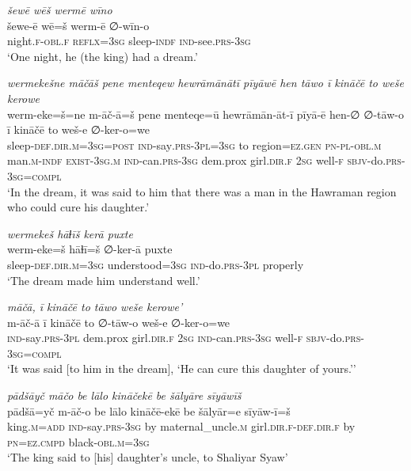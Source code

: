 \ea \label{ŽP.153}
\textit{šewē wēš wermē wīno} \\ 
\gll šewe-ē wē=š werm-ē ∅-wīn-o \\ 
 night\textsc{.f}\textsc{-obl}\textsc{.f} \textsc{reflx}\textsc{=3sg} sleep\textsc{-indf} \textsc{ind-}see\textsc{.prs}\textsc{-3sg} \\ 
\glt `One night, he (the king) had a dream.'
\z 
 
\ea \label{ŽP.154}
\textit{wermekešne māčāš pene menteqew hewrāmānātī pīyāwē hen tāwo ī kināčē to weše kerowe} \\ 
\gll werm-eke=š=ne m-āč-ā=š pene menteqe=ū hewrāmān-āt-ī pīyā-ē hen-∅ ∅-tāw-o ī kināčē to weš-e ∅-ker-o=we \\ 
 sleep\textsc{-def}\textsc{.dir}\textsc{.m}\textsc{=3sg}\textsc{=\textsc{post}} \textsc{ind-}say\textsc{.prs}\textsc{-3pl}\textsc{=3sg} to region=\textsc{ez.gen} \textsc{pn}\textsc{\textsc{-pl}}\textsc{-obl}\textsc{.m} man\textsc{.m}\textsc{-indf} \textsc{exist}\textsc{-3sg}\textsc{.m} \textsc{ind-}can\textsc{.prs}\textsc{-3sg} dem.prox girl\textsc{.dir}\textsc{.f} \textsc{2sg} well\textsc{-f} \textsc{sbjv-}do\textsc{.prs}\textsc{-3sg}\textsc{=compl} \\ 
\glt `In the dream, it was said to him that there was a man in the Hawraman region who could cure his daughter.'
\z 
 
\ea \label{ŽP.155}
\textit{wermekeš hāɫīš kerā puxte} \\ 
\gll werm-eke=š hāɫī=š ∅-ker-ā puxte \\ 
 sleep\textsc{-def}\textsc{.dir}\textsc{.m}\textsc{=3sg} understood\textsc{=3sg} \textsc{ind-}do\textsc{.prs}\textsc{-3pl} properly \\ 
\glt `The dream made him understand well.'
\z 
 
\ea \label{ŽP.156}
\textit{māčā, ī kināčē to tāwo weše kerowe’} \\ 
\gll m-āč-ā ī kināčē to ∅-tāw-o weš-e ∅-ker-o=we \\ 
 \textsc{ind-}say\textsc{.prs}\textsc{-3pl} dem.prox girl\textsc{.dir}\textsc{.f} \textsc{2sg} \textsc{ind-}can\textsc{.prs}\textsc{-3sg} well\textsc{-f} \textsc{sbjv-}do\textsc{.prs}\textsc{-3sg}\textsc{=compl} \\ 
\glt `It was said [to him in the dream], ‘He can cure this daughter of yours.’'
\z 
 
\ea \label{ŽP.157}
\textit{pādšāyč māčo be lālo kināčekē be šālyāre sīyāwīš} \\ 
\gll pādšā=yč m-āč-o be lālo kināčē-ekē be šālyār=e sīyāw-ī=š \\ 
 king\textsc{.m}\textsc{=add} \textsc{ind-}say\textsc{.prs}\textsc{-3sg} by maternal\_uncle\textsc{.m} girl\textsc{.dir}\textsc{.f}\textsc{-def}\textsc{.dir}\textsc{.f} by \textsc{pn}\textsc{=ez}\textsc{.cmpd} black\textsc{-obl}\textsc{.m}\textsc{=3sg} \\ 
\glt `The king said to [his] daughter’s uncle, to Shaliyar Syaw'
\z 
 
